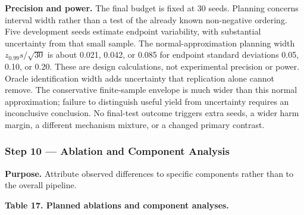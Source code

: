 \documentclass[
]{article}
\begin{document}
\textbf{Precision and power.} The final budget is fixed at 30 seeds.
Planning concerns interval width rather than a test of the already known
non-negative ordering. Five development seeds estimate endpoint
variability, with substantial uncertainty from that small sample. The
normal-approximation planning width \(z_{0.99}s/\sqrt{30}\) is about
0.021, 0.042, or 0.085 for endpoint standard deviations 0.05, 0.10, or
0.20. These are design calculations, not experimental precision or
power. Oracle identification width adds uncertainty that replication
alone cannot remove. The conservative finite-sample envelope is much
wider than this normal approximation; failure to distinguish useful
yield from uncertainty requires an inconclusive conclusion. No
final-test outcome triggers extra seeds, a wider harm margin, a
different mechanism mixture, or a changed primary contrast.

\hypertarget{step-10-ablation-and-component-analysis}{%
\subsubsection{Step 10 --- Ablation and Component
Analysis}\label{step-10-ablation-and-component-analysis}}

\textbf{Purpose.} Attribute observed differences to specific components
rather than to the overall pipeline.

\textbf{Table 17. Planned ablations and component analyses.}
\end{document}
